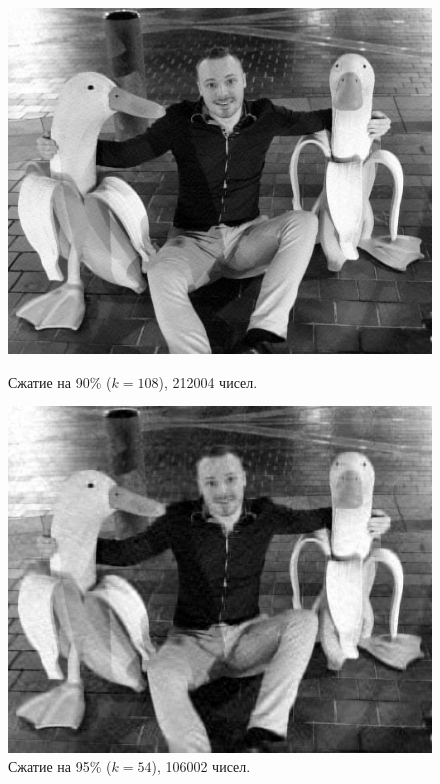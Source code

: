 \documentclass[a3paper,14pt]{extarticle}
\begin{document}
\begin{figure}[H]
    \begin{minipage}{0.45\textwidth}
        \centering\includegraphics[width=\textwidth]{banana ducks_108.jpg}
        \caption{Сжатие на 90\% ($k=108$), 212004 чисел.}
    \end{minipage}\hfill
    \begin{minipage}{0.45\textwidth}
        \centering\includegraphics[width=\textwidth]{banana ducks_54.jpg}
        \caption{Сжатие на 95\% ($k=54$), 106002 чисел.}
    \end{minipage}
\end{figure}
\end{document}

